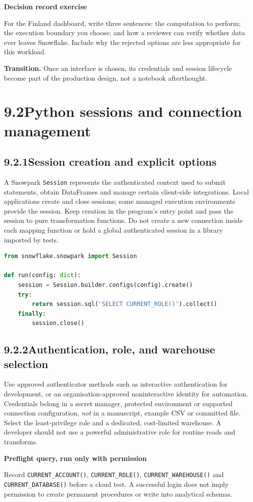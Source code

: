 \documentclass[11pt,twoside]{article}
\newcommand{\topic}[2]{\subsection*{#1\quad #2}}
\begin{document}
\begin{whitebox}\textbf{Decision record exercise}\par
For the Finland dashboard, write three sentences: the computation to perform; the execution boundary you choose; and how a reviewer can verify whether data ever leaves Snowflake. Include why the rejected options are less appropriate for this workload.\end{whitebox}
\textbf{Transition.} Once an interface is chosen, its credentials and session lifecycle become part of the production design, not a notebook afterthought.
\newpage
\section*{9.2\quad Python sessions and connection management}
\topic{9.2.1}{Session creation and explicit options}
A Snowpark \texttt{Session} represents the authenticated context used to submit statements, obtain DataFrames and manage certain client-side integrations. Local applications create and close sessions; some managed execution environments provide the session. Keep creation in the program's entry point and pass the session to pure transformation functions. Do not create a new connection inside each mapping function or hold a global authenticated session in a library imported by tests.
\begin{lstlisting}[language=Python,caption={Connection configuration is injected, never hard-coded.}]
from snowflake.snowpark import Session

def run(config: dict):
    session = Session.builder.configs(config).create()
    try:
        return session.sql('SELECT CURRENT_ROLE()').collect()
    finally:
        session.close()
\end{lstlisting}
\topic{9.2.2}{Authentication, role, and warehouse selection}
Use approved authenticator methods such as interactive authentication for development, or an organisation-approved noninteractive identity for automation. Credentials belong in a secret manager, protected environment or supported connection configuration, \emph{not} in a manuscript, example CSV or committed file. Select the least-privilege role and a dedicated, cost-limited warehouse. A developer should not use a powerful administrative role for routine reads and transforms.
\begin{whitebox}\textbf{Preflight query, run only with permission}\par
Record \texttt{CURRENT\_ACCOUNT()}, \texttt{CURRENT\_ROLE()}, \texttt{CURRENT\_WAREHOUSE()} and \texttt{CURRENT\_DATABASE()} before a cloud test. A successful login does not imply permission to create permanent procedures or write into analytical schemas.\end{whitebox}
\end{document}
